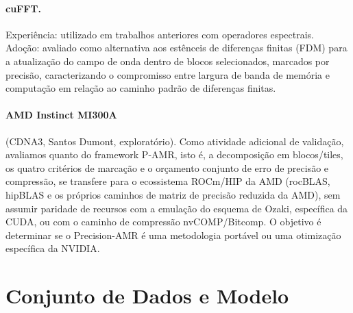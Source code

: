 \documentclass[12pt,a4paper]{article}
\newcommand{\pamr}{P\nobreakdash-AMR}
\begin{document}
\paragraph{cuFFT.} Experiência: utilizado em trabalhos anteriores com
operadores espectrais. Adoção: avaliado como alternativa aos estênceis de
diferenças finitas (FDM) para a atualização do campo de onda dentro de blocos
selecionados, marcados por precisão, caracterizando o compromisso entre
largura de banda de memória e computação em relação ao caminho padrão de
diferenças finitas.

\paragraph{AMD Instinct MI300A} (CDNA3, Santos Dumont, exploratório). Como
atividade adicional de validação, avaliamos quanto do framework \pamr{},
isto é, a decomposição em blocos/tiles, os quatro critérios de marcação e o
orçamento conjunto de erro de precisão e compressão, se transfere para o
ecossistema
ROCm/HIP da AMD (rocBLAS, hipBLAS e os próprios caminhos de matriz de precisão
reduzida da AMD), sem assumir paridade de recursos com a emulação do esquema
de Ozaki, específica da CUDA, ou com o caminho de compressão nvCOMP/Bitcomp. O
objetivo é determinar se o Precision-AMR é uma metodologia portável ou uma
otimização específica da NVIDIA.

\fi

\iffalse

\section{Conjunto de Dados e Modelo}
\end{document}
